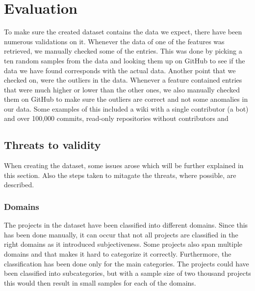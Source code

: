 \section{Evaluation}
To make sure the created dataset contains the data we expect, there have been numerous validations on it.
Whenever the data of one of the features was retrieved, we manually checked some of the entries.
This was done by picking a ten random samples from the data and looking them up on GitHub to see if the data we have found corresponds with the actual data.
Another point that we checked on, were the outliers in the data.
Whenever a feature contained entries that were much higher or lower than the other ones, we also manually checked them on GitHub to make sure the outliers are correct and not some anomalies in our data.
Some examples of this included a wiki with a single contributor (a bot) and over 100,000 commits, read-only repositories without contributors and 

\subsection{Threats to validity}
When creating the dataset, some issues arose which will be further explained in this section.
Also the steps taken to mitagate the threats, where possible, are described. \\

\subsubsection{Domains}
The projects in the dataset have been classified into different domains.
Since this has been done manually, it can occur that not all projects are classified in the right domains as it introduced subjectiveness.
Some projects also span multiple domains and that makes it hard to categorize it correctly.
Furthermore, the classification has been done only for the main categories.
The projects could have been classified into subcategories, but with a sample size of two thousand projects this would then result in small samples for each of the domains.
 \\

